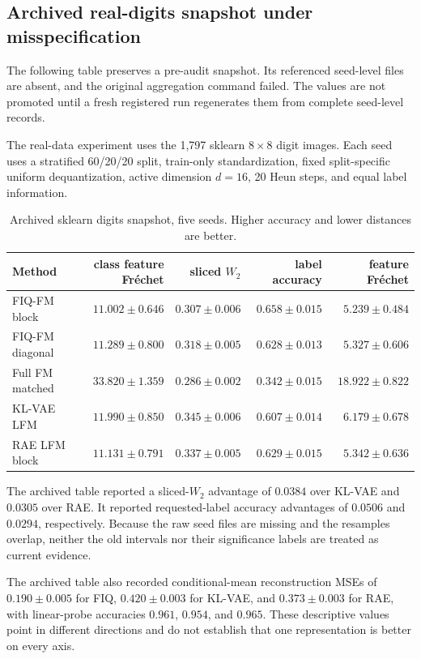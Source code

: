 \subsection{Archived real-digits snapshot under misspecification}

The following table preserves a pre-audit snapshot.  Its referenced seed-level files are absent, and the original aggregation command failed.  The values are not promoted until a fresh registered run regenerates them from complete seed-level records.

The real-data experiment uses the 1,797 sklearn $8\times8$ digit images.  Each seed uses a stratified 60/20/20 split, train-only standardization, fixed split-specific uniform dequantization, active dimension $d=16$, 20 Heun steps, and equal label information.

\begin{table}[h]
\centering
\caption{Archived sklearn digits snapshot, five seeds. Higher accuracy and lower distances are better.}
\begin{tabular}{lrrrr}
\toprule
Method & class feature Fr\'echet & sliced $W_2$ & label accuracy & feature Fr\'echet\\
\midrule
FIQ-FM block & $\mathbf{11.002\pm0.646}$ & $\mathbf{0.307\pm0.006}$ & $\mathbf{0.658\pm0.015}$ & $\mathbf{5.239\pm0.484}$\\
FIQ-FM diagonal & $11.289\pm0.800$ & $0.318\pm0.005$ & $0.628\pm0.013$ & $5.327\pm0.606$\\
Full FM matched & $33.820\pm1.359$ & $0.286\pm0.002$ & $0.342\pm0.015$ & $18.922\pm0.822$\\
KL-VAE LFM & $11.990\pm0.850$ & $0.345\pm0.006$ & $0.607\pm0.014$ & $6.179\pm0.678$\\
RAE LFM block & $11.131\pm0.791$ & $0.337\pm0.005$ & $0.629\pm0.015$ & $5.342\pm0.636$\\
\bottomrule
\end{tabular}
\label{tab:digits}
\end{table}

The archived table reported a sliced-$W_2$ advantage of $0.0384$ over KL-VAE and $0.0305$ over RAE.  It reported requested-label accuracy advantages of $0.0506$ and $0.0294$, respectively.  Because the raw seed files are missing and the resamples overlap, neither the old intervals nor their significance labels are treated as current evidence.

The archived table also recorded conditional-mean reconstruction MSEs of $0.190\pm0.005$ for FIQ, $0.420\pm0.003$ for KL-VAE, and $0.373\pm0.003$ for RAE, with linear-probe accuracies $0.961$, $0.954$, and $0.965$.  These descriptive values point in different directions and do not establish that one representation is better on every axis.

